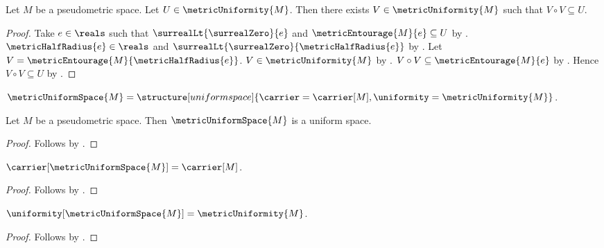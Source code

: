 \begin{proposition}\label{metric_uniformity_square}
    Let $M$ be a pseudometric space.
    Let $U\in\metricUniformity{M}$.
    Then there exists $V\in\metricUniformity{M}$ such that
        $V\circ V\subseteq U$.
\end{proposition}
\begin{proof}
    Take $e\in\reals$ such that
        $\surrealLt{\surrealZero}{e}$ and
        $\metricEntourage{M}{e}\subseteq U$
        by .
    $\metricHalfRadius{e}\in\reals$ and
        $\surrealLt{\surrealZero}{\metricHalfRadius{e}}$
        by .
    Let $V=\metricEntourage{M}{\metricHalfRadius{e}}$.
    $V\in\metricUniformity{M}$
        by .
    $V\circ V\subseteq\metricEntourage{M}{e}$
        by .
    Hence $V\circ V\subseteq U$ by .
\end{proof}

\begin{definition}\label{metric_uniform_space}
    $\metricUniformSpace{M}=
        \structure[uniform space]{
            \carrier=\carrier[M],
            \uniformity=\metricUniformity{M}
        }$.
\end{definition}

\begin{theorem}\label{metric_uniform_space_is_uniform_space}
    Let $M$ be a pseudometric space.
    Then $\metricUniformSpace{M}$ is a uniform space.
\end{theorem}
\begin{proof}
    Follows by
        .
\end{proof}

\begin{proposition}\label{metric_uniform_space_carrier}
    $\carrier[\metricUniformSpace{M}]=\carrier[M]$.
\end{proposition}
\begin{proof}
    Follows by
        .
\end{proof}

\begin{proposition}\label{metric_uniform_space_uniformity}
    $\uniformity[\metricUniformSpace{M}]=\metricUniformity{M}$.
\end{proposition}
\begin{proof}
    Follows by
        .
\end{proof}

